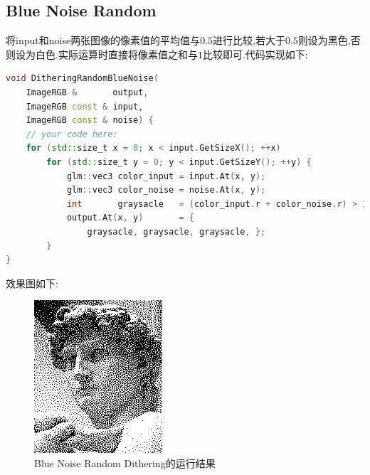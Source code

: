 \documentclass{ctexart}
\begin{document}
\subsection*{Blue Noise Random}
将{\codefont input}和{\codefont noise}两张图像的像素值的平均值与$0.5$进行比较,若大于$0.5$则设为黑色,否则设为白色.实际运算时直接将像素值之和与$1$比较即可.代码实现如下:
\begin{lstlisting}[language=C++]
void DitheringRandomBlueNoise(
    ImageRGB &       output,
    ImageRGB const & input,
    ImageRGB const & noise) {
    // your code here:
    for (std::size_t x = 0; x < input.GetSizeX(); ++x)
        for (std::size_t y = 0; y < input.GetSizeY(); ++y) {
            glm::vec3 color_input = input.At(x, y);
            glm::vec3 color_noise = noise.At(x, y);
            int       graysacle   = (color_input.r + color_noise.r) > 1 ? 1 : 0;
            output.At(x, y)       = {
                graysacle, graysacle, graysacle, };
        }
}
\end{lstlisting}
效果图如下:
\begin{figure}[H]
    \centering\includegraphics[scale=0.75]{figure/BlueNoise.png}
    \caption{Blue Noise Random Dithering的运行结果}
\end{figure}
\end{document}
